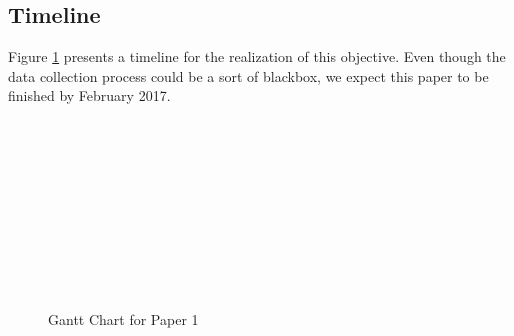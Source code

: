 \subsection{Timeline} Figure  \ref{GanttPaper1} presents a timeline for the realization of this objective. Even though the data collection process could be a sort of blackbox, we expect this paper to be finished by February 2017.

\begin{figure}[h]
	\begin{ganttchart}{1}{24}
		 \\
		 \\
		 \\
		 \\
		 \\
		 \\
		 \\
		 \\
		 \\
	\end{ganttchart}
	\caption{Gantt Chart for Paper 1}
	\label{GanttPaper1}
\end{figure}
